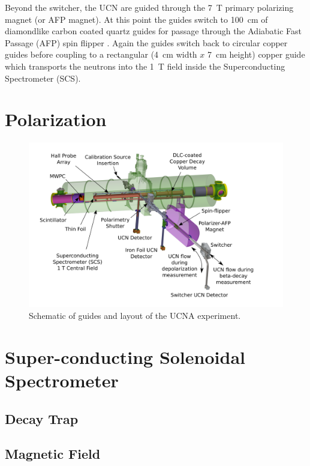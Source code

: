 Beyond the switcher,
the UCN are guided through the 7~T primary polarizing magnet (or AFP magnet). At this point
the guides switch to 100~cm of diamondlike carbon coated quartz guides \cite{mammei2010thin}
for passage through the Adiabatic Fast Passage (AFP) spin flipper \cite{holley2012high}. Again
the guides switch back to circular copper guides before coupling to a rectangular
(4~cm width $x$ 7~cm height) copper guide which transports the neutrons into the 1~T field
inside the Superconducting Spectrometer (SCS).


\section{Polarization}

\begin{figure}[h]
  \centering
  \includegraphics[scale=0.38]{2-UCNAExperiment/UCNAFig.pdf} 
  \caption{Schematic of guides and layout of the UCNA experiment.}
  \label{fig:setup}
\end{figure}

\section{Super-conducting Solenoidal Spectrometer}

\subsection{Decay Trap}

\subsection{Magnetic Field}


